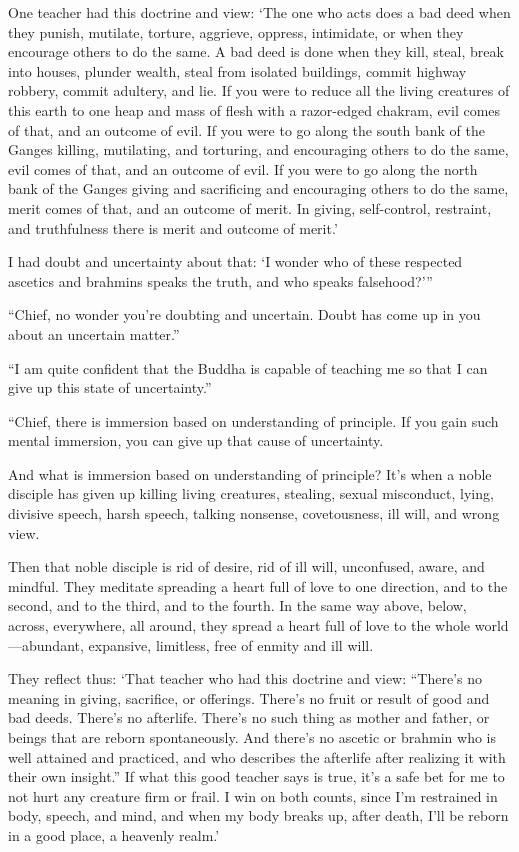 \documentclass[12pt,openany]{book}%
\begin{document}
One teacher had this doctrine and view: ‘The one who acts does a bad deed when they punish, mutilate, torture, aggrieve, oppress, intimidate, or when they encourage others to do the same. A bad deed is done when they kill, steal, break into houses, plunder wealth, steal from isolated buildings, commit highway robbery, commit adultery, and lie. If you were to reduce all the living creatures of this earth to one heap and mass of flesh with a razor-edged chakram, evil comes of that, and an outcome of evil. If you were to go along the south bank of the Ganges killing, mutilating, and torturing, and encouraging others to do the same, evil comes of that, and an outcome of evil. If you were to go along the north bank of the Ganges giving and sacrificing and encouraging others to do the same, merit comes of that, and an outcome of merit. In giving, self-control, restraint, and truthfulness there is merit and outcome of merit.’ 

I had doubt and uncertainty about that: ‘I wonder who of these respected ascetics and brahmins speaks the truth, and who speaks falsehood?’” 

“Chief, no wonder you’re doubting and uncertain. Doubt has come up in you about an uncertain matter.” 

“I am quite confident that the Buddha is capable of teaching me so that I can give up this state of uncertainty.” 

“Chief, there is immersion based on understanding of principle. If you gain such mental immersion, you can give up that cause of uncertainty. 

And what is immersion based on understanding of principle? It’s when a noble disciple has given up killing living creatures, stealing, sexual misconduct, lying, divisive speech, harsh speech, talking nonsense, covetousness, ill will, and wrong view. 

Then that noble disciple is rid of desire, rid of ill will, unconfused, aware, and mindful. They meditate spreading a heart full of love to one direction, and to the second, and to the third, and to the fourth. In the same way above, below, across, everywhere, all around, they spread a heart full of love to the whole world—abundant, expansive, limitless, free of enmity and ill will. 

They reflect thus: ‘That teacher who had this doctrine and view: “There’s no meaning in giving, sacrifice, or offerings. There’s no fruit or result of good and bad deeds. There’s no afterlife. There’s no such thing as mother and father, or beings that are reborn spontaneously. And there’s no ascetic or brahmin who is well attained and practiced, and who describes the afterlife after realizing it with their own insight.” If what this good teacher says is true, it’s a safe bet for me to not hurt any creature firm or frail. I win on both counts, since I’m restrained in body, speech, and mind, and when my body breaks up, after death, I’ll be reborn in a good place, a heavenly realm.’ 
\end{document}
